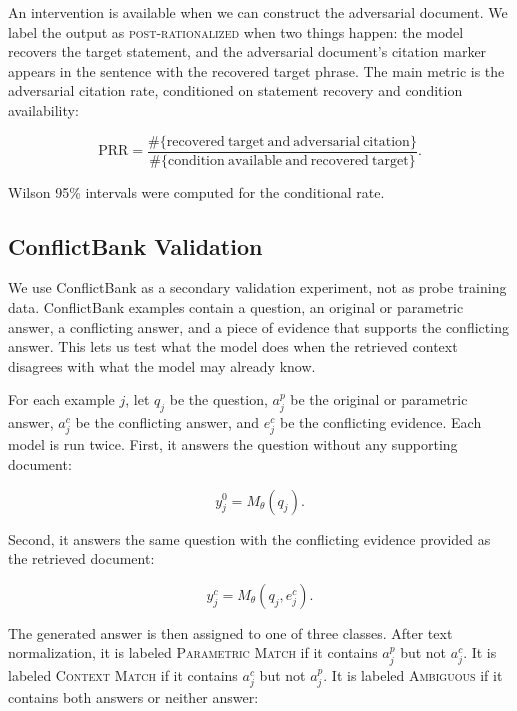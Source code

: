 \documentclass[11pt]{article}
\begin{document}
An intervention is available when we can construct the adversarial document. We label the output as \textsc{post-rationalized} when two things happen: the model recovers the target statement, and the adversarial document's citation marker appears in the sentence with the recovered target phrase. The main metric is the adversarial citation rate, conditioned on statement recovery and condition availability:

\begin{equation}
    \mathrm{PRR} = \frac{\#\{\mathrm{recovered\ target\ and\ adversarial\ citation}\}}{\#\{\mathrm{condition\ available\ and\ recovered\ target}\}}.
\end{equation}

Wilson 95\% intervals were computed for the conditional rate.

\subsection{ConflictBank Validation}
\label{subsec:conflictbank-validation}

We use ConflictBank as a secondary validation experiment, not as probe training data. ConflictBank examples contain a question, an original or parametric answer, a conflicting answer, and a piece of evidence that supports the conflicting answer. This lets us test what the model does when the retrieved context disagrees with what the model may already know.

For each example $j$, let $q_j$ be the question, $a_j^{p}$ be the original or parametric answer, $a_j^{c}$ be the conflicting answer, and $e_j^{c}$ be the conflicting evidence. Each model is run twice. First, it answers the question without any supporting document:

\begin{equation}
    y_j^{0}=M_{\theta}(q_j).
\end{equation}

Second, it answers the same question with the conflicting evidence provided as the retrieved document:

\begin{equation}
    y_j^{c}=M_{\theta}(q_j,e_j^{c}).
\end{equation}

The generated answer is then assigned to one of three classes. After text normalization, it is labeled \textsc{Parametric Match} if it contains $a_j^{p}$ but not $a_j^{c}$. It is labeled \textsc{Context Match} if it contains $a_j^{c}$ but not $a_j^{p}$. It is labeled \textsc{Ambiguous} if it contains both answers or neither answer:
\end{document}

